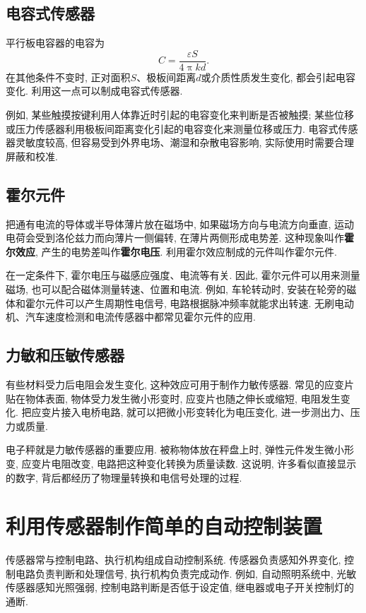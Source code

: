 \documentclass[11pt,a4paper]{ctexbook}
\begin{document}
\subsection{电容式传感器}

平行板电容器的电容为
$$C=\frac{\varepsilon S}{4\uppi k d}.$$
在其他条件不变时, 正对面积$S$、极板间距离$d$或介质性质发生变化, 都会引起电容变化.
利用这一点可以制成电容式传感器.

例如, 某些触摸按键利用人体靠近时引起的电容变化来判断是否被触摸; 某些位移或压力传感器利用极板间距离变化引起的电容变化来测量位移或压力.
电容式传感器灵敏度较高, 但容易受到外界电场、潮湿和杂散电容影响, 实际使用时需要合理屏蔽和校准.

\subsection{霍尔元件}

把通有电流的导体或半导体薄片放在磁场中, 如果磁场方向与电流方向垂直, 运动电荷会受到洛伦兹力而向薄片一侧偏转,
在薄片两侧形成电势差. 这种现象叫作\textbf{霍尔效应}, 产生的电势差叫作\textbf{霍尔电压}. 利用霍尔效应制成的元件叫作霍尔元件.

在一定条件下, 霍尔电压与磁感应强度、电流等有关. 因此, 霍尔元件可以用来测量磁场, 也可以配合磁体测量转速、位置和电流.
例如, 车轮转动时, 安装在轮旁的磁体和霍尔元件可以产生周期性电信号, 电路根据脉冲频率就能求出转速.
无刷电动机、汽车速度检测和电流传感器中都常见霍尔元件的应用.

\subsection{力敏和压敏传感器}

有些材料受力后电阻会发生变化, 这种效应可用于制作力敏传感器. 常见的应变片贴在物体表面,
物体受力发生微小形变时, 应变片也随之伸长或缩短, 电阻发生变化. 把应变片接入电桥电路,
就可以把微小形变转化为电压变化, 进一步测出力、压力或质量.

电子秤就是力敏传感器的重要应用. 被称物体放在秤盘上时, 弹性元件发生微小形变,
应变片电阻改变, 电路把这种变化转换为质量读数. 这说明, 许多看似直接显示的数字,
背后都经历了物理量转换和电信号处理的过程.

\section{利用传感器制作简单的自动控制装置}

传感器常与控制电路、执行机构组成自动控制系统. 传感器负责感知外界变化,
控制电路负责判断和处理信号, 执行机构负责完成动作. 例如, 自动照明系统中,
光敏传感器感知光照强弱, 控制电路判断是否低于设定值, 继电器或电子开关控制灯的通断.
\end{document}
